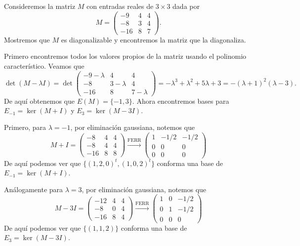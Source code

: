 \begin{example}
  Consideremos la matriz $M$ con entradas reales de $3\times 3$ dada por
  \[
    M = \begin{pmatrix} -9 & 4 & 4 \\ -8  & 3 & 4 \\ -16 & 8 & 7 \end{pmatrix}.
  \]
  Mostremos que $M$ es diagonalizable y encontremos la matriz que la diagonaliza.

  \examplesolution

  Primero encontremos todos los valores propios de la matriz usando el polinomio característico. Veamos que
  \[
  \det(M-\lambda I) = \det\begin{pmatrix} -9 - \lambda & 4 & 4 \\ -8  & 3 - \lambda & 4 \\ -16 & 8 & 7 - \lambda \end{pmatrix} 
    = -\lambda^3+\lambda^2+5\lambda+3 = -(\lambda+1)^2(\lambda-3).
  \]
  De aquí obtenemos que $E(M) = \{-1, 3\}$. Ahora encontremos bases para $E_{-1} = \ker(M + I)$ y $E_{3} = \ker(M - 3I)$.

  Primero, para $\lambda = -1$, por eliminación gaussiana, notemos que
  \[
    M + I = \begin{pmatrix} -8 & 4 & 4 \\ -8  & 4 & 4 \\ -16 & 8 & 8 \end{pmatrix}
      \xrightarrow{\text{FERR}} \begin{pmatrix} 1 & -1/2 & -1/2 \\ 0 & 0 & 0 \\ 0 & 0 & 0 \end{pmatrix}
  \]
  De aquí podemos ver que $\{(1,2,0)^t, (1,0,2)^t\}$ conforma una base de $E_{-1} = \ker(M + I)$.

  Análogamente para $\lambda = 3$, por eliminación gaussiana, notemos que
  \[
    M - 3I = \begin{pmatrix} -12 & 4 & 4 \\ -8  & 0 & 4 \\ -16 & 8 & 4 \end{pmatrix}
      \xrightarrow{\text{FERR}} 
      \begin{pmatrix} 1 & 0 & -1/2 \\ 0 & 1 & -1/2 \\ 0 & 0 & 0 \end{pmatrix}
  \]
  De aquí podemos ver que $\{(1,1,2)\}$ conforma una base de $E_{3} = \ker(M - 3I)$.


\end{example}
